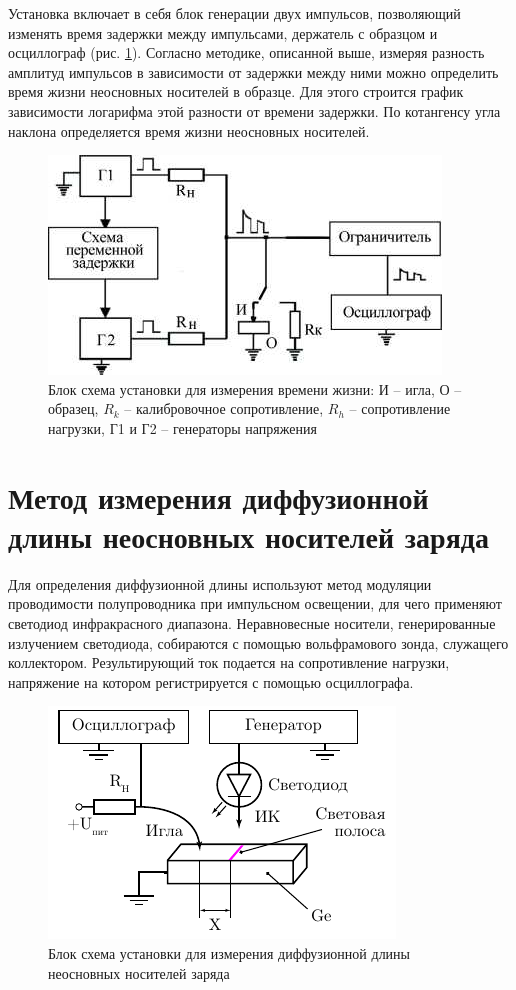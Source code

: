 Установка включает в себя блок генерации двух импульсов, позволяющий изменять время задержки между импульсами, держатель
с образцом и осциллограф (рис.  \ref{fig:figure11}). Согласно методике, описанной выше, измеряя разность амплитуд
импульсов в зависимости от задержки между ними можно определить время жизни неосновных носителей в образце. Для этого
строится график зависимости логарифма этой разности от времени задержки. По котангенсу угла наклона определяется время
жизни неосновных носителей.
\begin{figure}[H]
	\centering
	\includegraphics[width = 0.6\linewidth]{img/12}
	\caption{Блок схема установки для измерения времени жизни:
И -- игла, О -- образец, $R_k$ -- калибровочное сопротивление, $R_h$ -- сопротивление нагрузки, Г1 и Г2 -- генераторы напряжения }
	\label{fig:figure11}
\end{figure}


\section{Метод измерения диффузионной длины неосновных носителей заряда}

Для определения диффузионной длины используют метод модуляции проводимости полупроводника при импульсном освещении, для
чего применяют светодиод инфракрасного диапазона. Неравновесные носители, генерированные излучением светодиода,
собираются с помощью вольфрамового зонда, служащего коллектором. Результирующий ток подается на сопротивление нагрузки,
напряжение на котором регистрируется с помощью осциллографа.

\begin{figure}[H]
	\centering
	\includegraphics[width = 0.5\linewidth]{fig/scheme.pdf}
	\caption{Блок схема установки для измерения диффузионной длины неосновных носителей заряда}
	\label{fig:figure12}
\end{figure}

